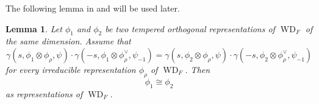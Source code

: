 \documentclass[article]{article}
\numberwithin{equation}{section}
\newtheorem{lemma}[theorem]{Lemma}
\theoremstyle{definition}
\DeclareMathOperator{\WD}{WD}
\DeclareMathOperator{\SP}{Sp}
\begin{document}
The following lemma in \cite[Lemma 12.3]{MR2999299} and \cite[Lemma A.6]{MR3573972} will be used later.  
\begin{lemma}\label{gammadetermine}
	Let $\phi_{1}$ and $\phi_{2}$ be two tempered orthogonal representations of $\WD_F$ of the same dimension. Assume that 
	$$\gamma\left(s, \phi_{1} \otimes \phi_{\rho}, \psi\right) \cdot \gamma\left(-s, \phi_{1} \otimes \phi_{\rho}^{\vee}, \psi_{-1}\right)=\gamma\left(s, \phi_{2} \otimes \phi_{\rho}, \psi\right) \cdot \gamma\left(-s, \phi_{2} \otimes \phi_{\rho}^{\vee}, \psi_{-1}\right)$$
	for every irreducible representation $\phi_{\rho}$ of $\WD_F$. Then
	$$\phi_{1} \cong \phi_{2}$$
	as representations of $\WD_F$. 
\end{lemma} 
\begin{comment}
\begin{proof}
	The proof is similar to \cite[Lemma 12.3]{MR2999299}. Note that the Lemma 12.3 there is for discrete paramters, but the proof works for tempered parameter as well. 
\end{proof} 
\end{comment}


 



\end{document}
